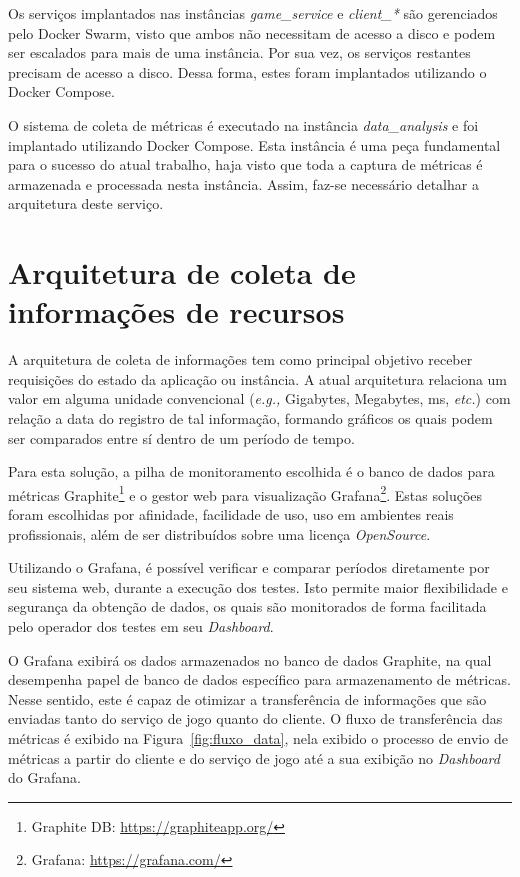 Os serviços implantados nas instâncias \textit{game\_service} e \textit{client\_*} são gerenciados pelo Docker Swarm, visto que ambos não necessitam de acesso a disco e podem ser escalados para mais de uma instância.
%
Por sua vez, os serviços restantes precisam de acesso a disco. 
%
Dessa forma, estes foram implantados utilizando o Docker Compose.


O sistema de coleta de métricas é executado na instância \textit{data\_analysis} e foi implantado utilizando Docker Compose.
%
Esta instância é uma peça fundamental para o sucesso do atual trabalho, haja visto que toda a captura de métricas é armazenada e processada nesta instância.
%
Assim, faz-se necessário detalhar a arquitetura deste serviço.


\section{Arquitetura de coleta de informações de recursos}
\label{sec:informacoes}

A arquitetura de coleta de informações tem como principal objetivo receber requisições do estado da aplicação ou instância.
%
A atual arquitetura relaciona um valor em alguma unidade convencional (\textit{e.g.,} Gigabytes, Megabytes, ms, \textit{etc.}) com relação a data do registro de tal informação, formando gráficos os quais podem ser comparados entre sí dentro de um período de tempo.

Para esta solução, a pilha de monitoramento escolhida é o banco de dados para métricas Graphite\footnote{Graphite DB: \url{https://graphiteapp.org/}} e o gestor web para visualização Grafana\footnote{Grafana: \url{https://grafana.com/}}.
%
Estas soluções foram escolhidas por afinidade, facilidade de uso, uso em ambientes reais profissionais, além de ser distribuídos sobre uma licença \textit{OpenSource}.


Utilizando o Grafana, é possível verificar e comparar períodos diretamente por seu sistema web, durante a execução dos testes.
%
Isto permite maior flexibilidade e segurança da obtenção de dados, os quais são monitorados de forma facilitada pelo operador dos testes em seu \textit{Dashboard}.

O Grafana exibirá os dados armazenados no banco de dados Graphite, na qual desempenha papel de banco de dados específico para armazenamento de métricas.
%
Nesse sentido, este é capaz de otimizar a transferência de informações que são enviadas tanto do serviço de jogo quanto do cliente.
%
O fluxo de transferência das métricas é exibido na Figura~\ref{fig:fluxo_data}, nela exibido o processo de envio de métricas a partir do cliente e do serviço de jogo até a sua exibição no \textit{Dashboard} do Grafana.

